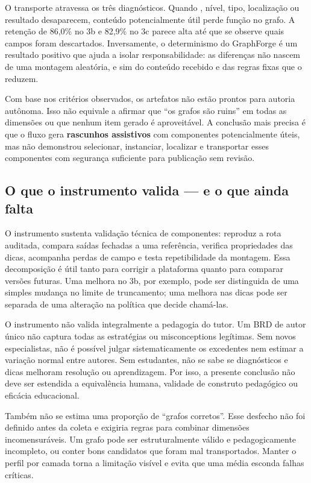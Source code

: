 \documentclass[11pt,a4paper]{article}
\begin{document}
O transporte atravessa os três diagnósticos. Quando , nível, tipo, localização ou resultado desaparecem, conteúdo potencialmente útil perde função no grafo. A retenção de 86,0\% no 3b e 82,9\% no 3c parece alta até que se observe quais campos foram descartados. Inversamente, o determinismo do GraphForge é um resultado positivo que ajuda a isolar responsabilidade: as diferenças não nascem de uma montagem aleatória, e sim do conteúdo recebido e das regras fixas que o reduzem.

Com base nos critérios observados, os artefatos não estão prontos para autoria autônoma. Isso não equivale a afirmar que ``os grafos são ruins'' em todas as dimensões ou que nenhum item gerado é aproveitável. A conclusão mais precisa é que o fluxo gera \textbf{rascunhos assistivos} com componentes potencialmente úteis, mas não demonstrou selecionar, instanciar, localizar e transportar esses componentes com segurança suficiente para publicação sem revisão.

\subsection{O que o instrumento valida --- e o que ainda falta}

O instrumento sustenta validação técnica de componentes: reproduz a rota auditada, compara saídas fechadas a uma referência, verifica propriedades das dicas, acompanha perdas de campo e testa repetibilidade da montagem. Essa decomposição é útil tanto para corrigir a plataforma quanto para comparar versões futuras. Uma melhora no 3b, por exemplo, pode ser distinguida de uma simples mudança no limite de truncamento; uma melhora nas dicas pode ser separada de uma alteração na política que decide chamá-las.

O instrumento não valida integralmente a pedagogia do tutor. Um BRD de autor único não captura todas as estratégias ou misconceptions legítimas. Sem novos especialistas, não é possível julgar sistematicamente os excedentes nem estimar a variação normal entre autores. Sem estudantes, não se sabe se diagnósticos e dicas melhoram resolução ou aprendizagem. Por isso, a presente conclusão não deve ser estendida a equivalência humana, validade de construto pedagógico ou eficácia educacional.

Também não se estima uma proporção de ``grafos corretos''. Esse desfecho não foi definido antes da coleta e exigiria regras para combinar dimensões incomensuráveis. Um grafo pode ser estruturalmente válido e pedagogicamente incompleto, ou conter bons candidatos que foram mal transportados. Manter o perfil por camada torna a limitação visível e evita que uma média esconda falhas críticas.
\end{document}
